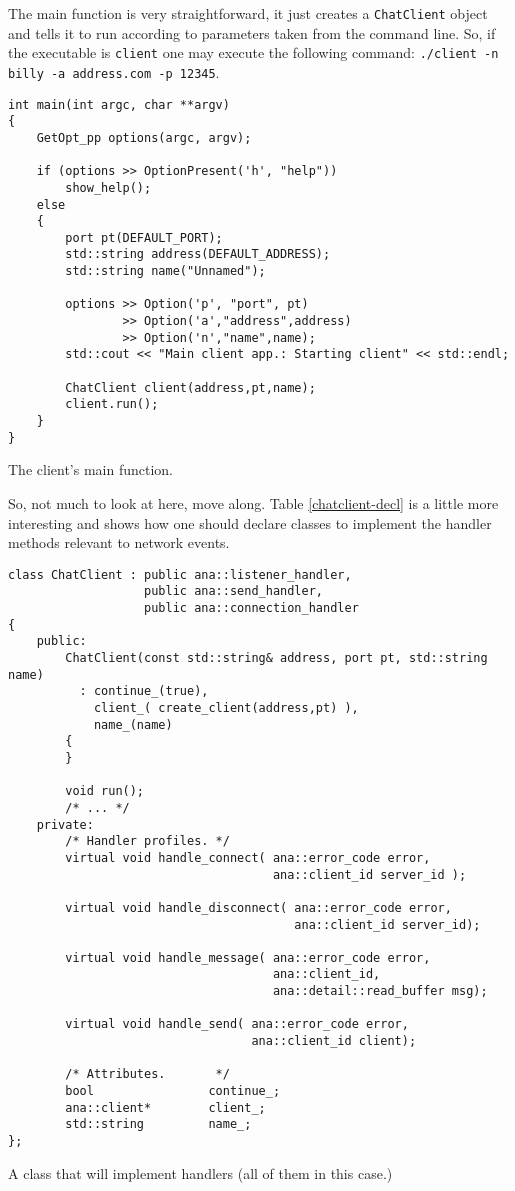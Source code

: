 \documentclass[a4paper,12pt,english]{article}
\begin{document}
The main function is very straightforward, it just creates a \texttt{ChatClient}
object and tells it to run according to parameters taken from the command
line. So, if the executable is \texttt{client} one may execute the
following command: \texttt{./client -n billy -a address.com -p 12345}.

\begin{table}[!htb]
\lstset{language=C++}
\begin{lstlisting}[frame=single]
int main(int argc, char **argv)
{
    GetOpt_pp options(argc, argv);

    if (options >> OptionPresent('h', "help"))
        show_help();
    else
    {
        port pt(DEFAULT_PORT);
        std::string address(DEFAULT_ADDRESS);
        std::string name("Unnamed");

        options >> Option('p', "port", pt) 
                >> Option('a',"address",address) 
                >> Option('n',"name",name);
        std::cout << "Main client app.: Starting client" << std::endl;

        ChatClient client(address,pt,name);
        client.run();
    }
}
\end{lstlisting}
\centering \caption{The client's main function.} 
\label{client-main}
\end{table}

So, not much to look at here, move along. Table \ref{chatclient-decl} is a little
more interesting and shows how one should declare classes to implement the
handler methods relevant to network events. 

\begin{table}[!htb]
\lstset{language=C++}
\begin{lstlisting}[frame=single]
class ChatClient : public ana::listener_handler,
                   public ana::send_handler,
                   public ana::connection_handler
{
    public:
        ChatClient(const std::string& address, port pt, std::string name)
          : continue_(true),
            client_( create_client(address,pt) ),
            name_(name)
        {
        }
        
        void run();
        /* ... */
    private:
        /* Handler profiles. */
        virtual void handle_connect( ana::error_code error, 
                                     ana::client_id server_id );

        virtual void handle_disconnect( ana::error_code error, 
                                        ana::client_id server_id);

        virtual void handle_message( ana::error_code error, 
                                     ana::client_id, 
                                     ana::detail::read_buffer msg);

        virtual void handle_send( ana::error_code error, 
                                  ana::client_id client);

        /* Attributes.       */
        bool                continue_;
        ana::client*        client_;
        std::string         name_;
};
\end{lstlisting}
\centering \caption{A class that will implement handlers (all of them in this case.)} 
\label{chatclient-decl}
\end{table}
\end{document}
